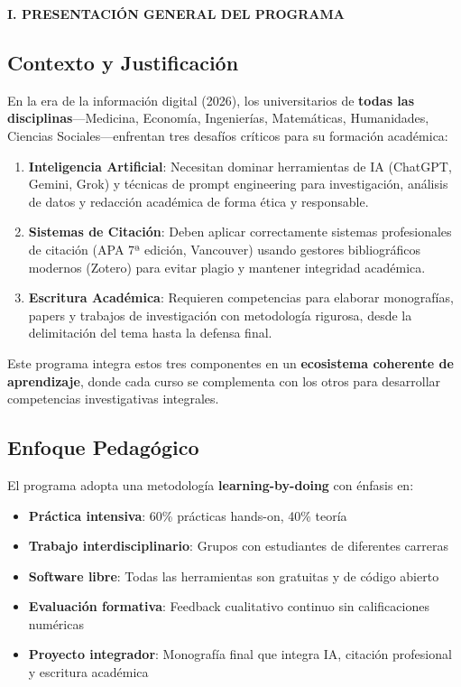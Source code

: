 \documentclass[12pt,a4paper]{yaac-luatex}
\newcommand{\faInfoCircle}{\textbullet}
\newcommand{\secciontitulo}[1]{
	\vspace{0.5cm}
	\begin{tcolorbox}[
		enhanced,
		colback=maincolor,
		colframe=maincolor,
		arc=3pt,
		boxrule=0pt,
		left=8pt,
		right=8pt,
		top=6pt,
		bottom=6pt
		]
		{\color{white}\large\bfseries #1}
	\end{tcolorbox}
}
\begin{document}
	\newpage
	
	\secciontitulo{\faInfoCircle \hspace{0.3em} I. PRESENTACIÓN GENERAL DEL PROGRAMA}
	
	\subsection*{Contexto y Justificación}
	
	En la era de la información digital (2026), los universitarios de \textbf{todas las disciplinas}---Medicina, Economía, Ingenierías, Matemáticas, Humanidades, Ciencias Sociales---enfrentan tres desafíos críticos para su formación académica:
	
	\begin{enumerate}[leftmargin=*, itemsep=0.3cm]
		\item \textbf{Inteligencia Artificial}: Necesitan dominar herramientas de IA (ChatGPT, Gemini, Grok) y técnicas de prompt engineering para investigación, análisis de datos y redacción académica de forma ética y responsable.
		
		\item \textbf{Sistemas de Citación}: Deben aplicar correctamente sistemas profesionales de citación (APA 7ª edición, Vancouver) usando gestores bibliográficos modernos (Zotero) para evitar plagio y mantener integridad académica.
		
		\item \textbf{Escritura Académica}: Requieren competencias para elaborar monografías, papers y trabajos de investigación con metodología rigurosa, desde la delimitación del tema hasta la defensa final.
	\end{enumerate}
	
	Este programa integra estos tres componentes en un \textbf{ecosistema coherente de aprendizaje}, donde cada curso se complementa con los otros para desarrollar competencias investigativas integrales.
	
	\subsection*{Enfoque Pedagógico}
	
	El programa adopta una metodología \textbf{learning-by-doing} con énfasis en:
	
	\begin{itemize}[leftmargin=*, itemsep=0.2cm]
		\item \textbf{Práctica intensiva}: 60\% prácticas hands-on, 40\% teoría
		\item \textbf{Trabajo interdisciplinario}: Grupos con estudiantes de diferentes carreras
		\item \textbf{Software libre}: Todas las herramientas son gratuitas y de código abierto
		\item \textbf{Evaluación formativa}: Feedback cualitativo continuo sin calificaciones numéricas
		\item \textbf{Proyecto integrador}: Monografía final que integra IA, citación profesional y escritura académica
	\end{itemize}
	
\end{document}
